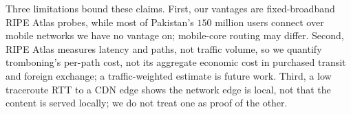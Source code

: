 \documentclass[sigconf,anonymous,10pt]{acmart}
\newcommand{\hlnew}[1]{{\sethlcolor{newhl}\hl{#1}}}
\begin{document}
Three limitations bound these claims. First, our vantages are fixed-broadband RIPE Atlas probes, while most of Pakistan's $150$ million users connect over mobile networks we have no vantage on; mobile-core routing may differ. %
Second, RIPE Atlas measures latency and paths, not traffic volume, so we quantify tromboning's per-path cost, not its aggregate economic cost in purchased transit and foreign exchange; a traffic-weighted estimate is future work. Third, a low traceroute RTT to a CDN edge shows the network edge is local, not that the content is served locally; we do not treat one as proof of the other. 

\end{document}
